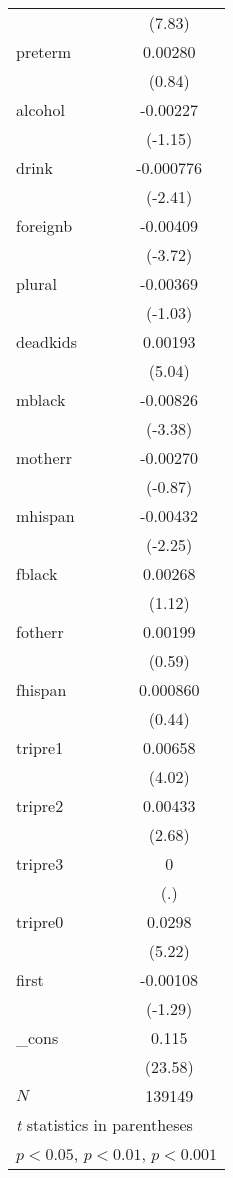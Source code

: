 {\begin{longtable}{l*{1}{c}}
            &      (7.83)         \\
[1em]
preterm     &     0.00280         \\
            &      (0.84)         \\
[1em]
alcohol     &    -0.00227         \\
            &     (-1.15)         \\
[1em]
drink       &   -0.000776\sym{*}  \\
            &     (-2.41)         \\
[1em]
foreignb    &    -0.00409\sym{***}\\
            &     (-3.72)         \\
[1em]
plural      &    -0.00369         \\
            &     (-1.03)         \\
[1em]
deadkids    &     0.00193\sym{***}\\
            &      (5.04)         \\
[1em]
mblack      &    -0.00826\sym{***}\\
            &     (-3.38)         \\
[1em]
motherr     &    -0.00270         \\
            &     (-0.87)         \\
[1em]
mhispan     &    -0.00432\sym{*}  \\
            &     (-2.25)         \\
[1em]
fblack      &     0.00268         \\
            &      (1.12)         \\
[1em]
fotherr     &     0.00199         \\
            &      (0.59)         \\
[1em]
fhispan     &    0.000860         \\
            &      (0.44)         \\
[1em]
tripre1     &     0.00658\sym{***}\\
            &      (4.02)         \\
[1em]
tripre2     &     0.00433\sym{**} \\
            &      (2.68)         \\
[1em]
tripre3     &           0         \\
            &         (.)         \\
[1em]
tripre0     &      0.0298\sym{***}\\
            &      (5.22)         \\
[1em]
first       &    -0.00108         \\
            &     (-1.29)         \\
[1em]
\_cons      &       0.115\sym{***}\\
            &     (23.58)         \\
\hline
\(N\)       &      139149         \\
\hline\hline
\multicolumn{2}{l}{\footnotesize \textit{t} statistics in parentheses}\\
\multicolumn{2}{l}{\footnotesize \sym{*} \(p<0.05\), \sym{**} \(p<0.01\), \sym{***} \(p<0.001\)}\\
\end{longtable}
}
